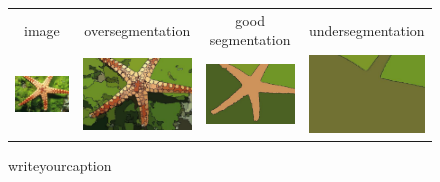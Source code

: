 \begin{figure}
\begin{center}
\begin{tabular}{ c  c  c  c }
 image & oversegmentation & good segmentation & undersegmentation \\
\includegraphics[width=3.15cm]{fig/seg_para/seg_para_2_1.jpg}
&\includegraphics[width=3.15cm]{fig/seg_para/seg_para_2_2.jpg}
&\includegraphics[width=3.15cm]{fig/seg_para/seg_para_2_3.jpg}
&\includegraphics[width=3.15cm]{fig/seg_para/seg_para_2_4.jpg}
\\
\end{tabular}
\end{center}
\caption{writeyourcaption}
\label{fig:seg_para}
\end{figure}
